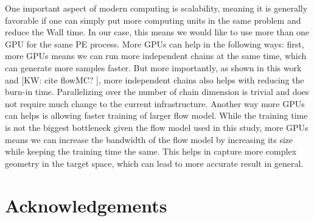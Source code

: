 \documentclass[twocolumn]{aastex631}
\newcommand{\kw}[1]{{\color{rb4}[KW: #1 ]}}
\begin{document}
One important aspect of modern computing is scalability, meaning it is generally
favorable if one can simply put more computing units in the same problem and
reduce the Wall time. In our case, this means we would like to use more than one
GPU for the same PE process. More GPUs can help in the following ways: first,
more GPUs means we can run more independent chains at the same time, which can
generate more samples faster. But more importantly, as shown in this work and
\kw{cite flowMC?}, more independent chains also helps with reducing the burn-in
time. Parallelizing over the number of chain dimension is trivial and does not
require much change to the current infrastructure. Another way more GPUs can
helps is allowing faster training of larger flow model. While the training time
is not the biggest bottleneck given the flow model used in this study, more GPUs
means we can increase the bandwidth of the flow model by increasing its size
while keeping the training time the same. This helps in capture more complex
geometry in the target space, which can lead to more accurate result in general.


\section{Acknowledgements}


\end{document}
